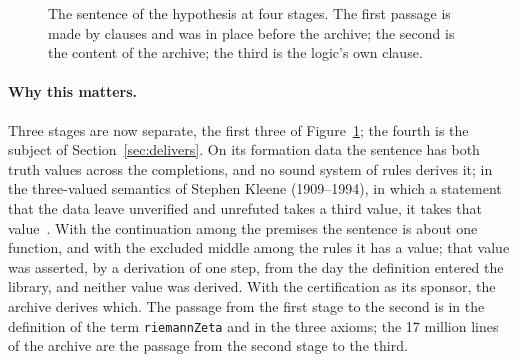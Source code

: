 \documentclass[11pt]{article}
\theoremstyle{definition}
\theoremstyle{remark}
\DeclareRobustCommand{\lean}[1]{{\renewcommand{\_}{\textunderscore\allowbreak}\texttt{#1}}}
\newcommand{\False}{\lean{False}}
\begin{document}
\begin{figure}[ht]
\centering
{}
\caption{The sentence of the hypothesis at four stages. The first passage is made by clauses and was in place before the archive; the second is the content of the archive; the third is the logic's own clause.}\label{fig:stages}
\end{figure}

\paragraph{Why this matters.} Three stages are now separate, the first three of Figure~\ref{fig:stages}; the fourth is the subject of Section~\ref{sec:delivers}. On its formation data the sentence has both truth values across the completions, and no sound system of rules derives it; in the three-valued semantics of Stephen Kleene (1909--1994), in which a statement that the data leave unverified and unrefuted takes a third value, it takes that value~\citep{kleene52,tv}. With the continuation among the premises the sentence is about one function, and with the excluded middle among the rules it has a value; that value was asserted, by a derivation of one step, from the day the definition entered the library, and neither value was derived. With the certification as its sponsor, the archive derives which. The passage from the first stage to the second is in the definition of the term \lean{riemannZeta} and in the three axioms; the 17 million lines of the archive are the passage from the second stage to the third.
\end{document}
